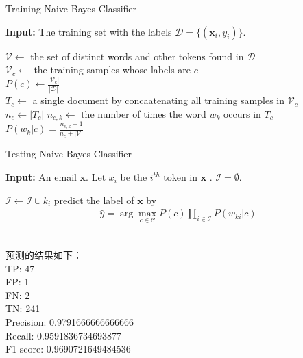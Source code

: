 \documentclass[11pt,letter,notitlepage]{article}
\begin{document}
\begin{algorithm}
\caption{Training Naive Bayes Classifier}
\label{alg:train_bayes}
\textbf{Input:} The training set with the labels $\mathcal{D}=\{(\textbf{x}_i,y_i)\}.$
\begin{algorithmic}[1]
\STATE $\mathcal{V}\leftarrow$ the set of distinct words and other tokens found in $\mathcal{D}$\\
\STATE $\mathcal{V}_c\leftarrow$ the training samples whose labels are $c$\\
\STATE $P(c)\leftarrow\frac{|\mathcal{V}_c|}{|\mathcal{D}|}$\\
\STATE $T_c\leftarrow$ a single document by concaatenating all training samples in $\mathcal{V}_c$\\
\STATE $n_c\leftarrow |T_c|$
\STATE $n_{c,k}\leftarrow$ the number of times the word $w_k$ occurs in $T_c$\\
\STATE $P(w_k|c)=\frac{n_{c,k}+1}{n_c+|\mathcal{V}|}$
\ENDFOR
\ENDFOR
\end{algorithmic}
\end{algorithm}

\begin{algorithm}
\caption{Testing Naive Bayes Classifier }
\label{alg:test_bayes}
\textbf{Input:} An email $\textbf{x}$. Let $x_i$ be the $i^{th}$ token in $\textbf{x}$ . $\mathcal{I}=\emptyset.$
\begin{algorithmic}[1]
\STATE $\mathcal{I}\leftarrow\mathcal{I}\cup k_i$
\ENDIF
\ENDFOR
\STATE predict the label of $\textbf{x}$ by 
\begin{align*}
    \hat{y}=\arg\max_{c\in\mathcal{C}} P(c)\prod_{i\in\mathcal{I}}P(w_{ki}|c)
\end{align*}
\end{algorithmic}
\end{algorithm}


\begin{solution}
	\heiti
	\ \\
	预测的结果如下：\\
	TP: 47\\
	FP: 1\\
	FN: 2\\
	TN: 241\\
	Precision: 0.9791666666666666\\
	Recall: 0.9591836734693877\\
	F1 score: 0.9690721649484536\\
\end{solution}
\end{document}
